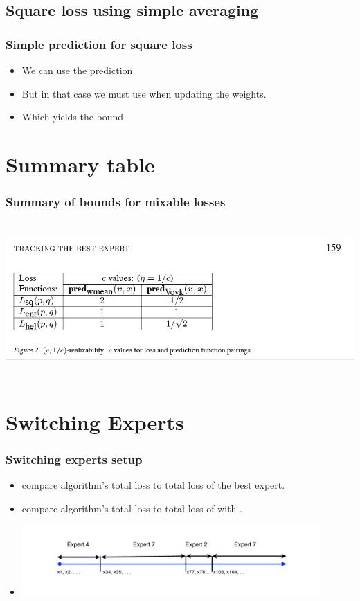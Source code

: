 \documentclass{beamer}
\begin{document}
\subsection{Square loss using simple averaging}

\begin{frame}
\frametitle{Simple prediction for square loss}
\begin{itemize}
\item We can use the prediction
\R{\[
\gamma = \frac{\sum_i \weight{i}{} \gamma_i}{\sum_i \weight{i}{}}
\]}
\item But in that case we must use  when updating the weights.
\item Which yields the bound
\end{itemize}
\end{frame}

\section{Summary table}

\begin{frame}
\frametitle{Summary of bounds for mixable losses}
\includegraphics[height=6cm]{figures/summarytable.jpg}
\end{frame}

\section{Switching Experts}

\begin{frame}
\frametitle{Switching experts setup}
\begin{itemize}
\item {} compare algorithm's total loss to total
  loss of the best expert.
\item {} compare algorithm's total loss to total
  loss of  with  .
\item
\includegraphics[width=4.5in]{figures/SwitchingExperts.pdf}
\end{itemize}
\end{frame}
\end{document}
